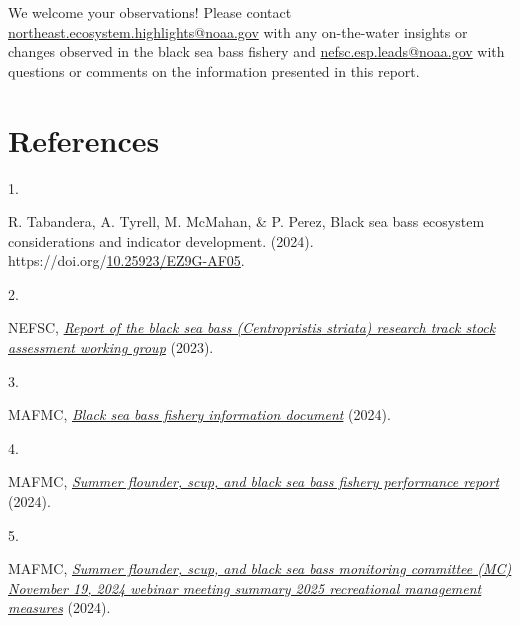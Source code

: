 \documentclass[
  10pt,
  letterpaper,
  DIV=11,
  numbers=noendperiod]{scrartcl}
\newlength{\cslhangindent}
\newlength{\csllabelwidth}
\newenvironment{CSLReferences}[2] %
 {\begin{list}{}{%
  \setlength{\itemindent}{0pt}
  \setlength{\leftmargin}{0pt}
  \setlength{\parsep}{0pt}
  \ifodd #1
   \setlength{\leftmargin}{\cslhangindent}
   \setlength{\itemindent}{-1\cslhangindent}
  \fi
  \setlength{\itemsep}{#2\baselineskip}}}
 {\end{list}}
\newcommand{\CSLLeftMargin}[1]{\parbox[t]{\csllabelwidth}{\strut#1\strut}}
\newcommand{\CSLRightInline}[1]{\parbox[t]{\linewidth - \csllabelwidth}{\strut#1\strut}}
\begin{document}
\centering\normalsize

We welcome your observations! Please contact
\url{northeast.ecosystem.highlights@noaa.gov} with any on-the-water
insights or changes observed in the black sea bass fishery and
\url{nefsc.esp.leads@noaa.gov} with questions or comments on the
information presented in this report.

\newpage
{}

\section*{References}\label{references}

\label{refs}
\begin{CSLReferences}{0}{0}
\CSLLeftMargin{1. }%
\CSLRightInline{R. Tabandera, A. Tyrell, M. McMahan, \& P. Perez, Black
sea bass ecosystem considerations and indicator development. (2024).
https://doi.org/\href{https://doi.org/10.25923/EZ9G-AF05}{10.25923/EZ9G-AF05}.}

\CSLLeftMargin{2. }%
\CSLRightInline{NEFSC,
\emph{\href{https://d23h0vhsm26o6d.cloudfront.net/11a.-2023_BSB_UNIT_RTWG_Report_V2_12_2_2023.pdf}{Report
of the black sea bass (\emph{{Centropristis} striata}) research track
stock assessment working group}} (2023).}

\CSLLeftMargin{3. }%
\CSLRightInline{MAFMC,
\emph{\href{https://static1.squarespace.com/static/511cdc7fe4b00307a2628ac6/t/6683032fa306b9070227348b/1719862063436/2024_BSB-fishery-info-doc.pdf}{Black
sea bass fishery information document}} (2024).}

\CSLLeftMargin{4. }%
\CSLRightInline{MAFMC,
\emph{\href{https://static1.squarespace.com/static/511cdc7fe4b00307a2628ac6/t/6697d5dde4c39b20168045b7/1721226717179/b_SFSBSB-FPR-Jul-2024.pdf}{Summer
flounder, scup, and black sea bass fishery performance report}} (2024).}

\CSLLeftMargin{5. }%
\CSLRightInline{MAFMC,
\emph{\href{https://static1.squarespace.com/static/511cdc7fe4b00307a2628ac6/t/674755f846e791454569703f/1732728312681/01_2025+SF+Rec+Measures.pdf}{Summer
flounder, scup, and black sea bass monitoring committee ({MC})
{November} 19, 2024 webinar meeting summary 2025 recreational management
measures}} (2024).}


\end{CSLReferences}
\end{document}
